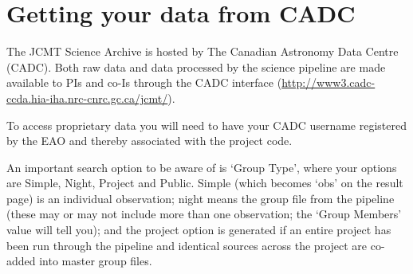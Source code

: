 \section{Getting your data from CADC}

The JCMT Science Archive is hosted by The Canadian Astronomy Data
Centre (CADC). Both raw data and data processed by the science
pipeline are made available to PIs and co-Is through the CADC
interface (\url{http://www3.cadc-ccda.hia-iha.nrc-cnrc.gc.ca/jcmt/}).

To access proprietary data you will need to have your CADC username
registered by the EAO and thereby associated with the project code.

An important search option to be aware of is `Group Type', where your
options are Simple, Night, Project and Public. Simple (which becomes
`obs' on the result page) is an individual observation; night means
the group file from the pipeline (these may or may not include more
than one observation; the `Group Members' value will tell you); and
the project option is generated if an entire project has been run
through the pipeline and identical sources across the project are
co-added into master group files.


